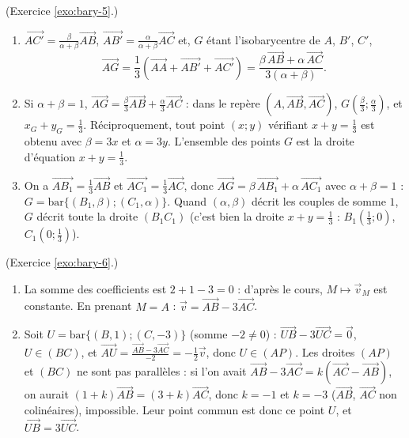\begin{corrige}
\begin{sol}
\end{sol}
%
\begin{sol} (Exercice \ref{exo:bary-5}.)
\begin{enumerate}
\item $\overrightarrow{AC'} = \frac{\beta}{\alpha+\beta}\overrightarrow{AB}$, $\overrightarrow{AB'} = \frac{\alpha}{\alpha+\beta}\overrightarrow{AC}$ et, $G$ \'etant l'isobarycentre de $A$, $B'$, $C'$,
      \[
      \overrightarrow{AG} = \frac{1}{3}\left(\overrightarrow{AA} + \overrightarrow{AB'} + \overrightarrow{AC'}\right) = \frac{\beta\,\overrightarrow{AB} + \alpha\,\overrightarrow{AC}}{3(\alpha+\beta)} .
      \]
\item Si $\alpha+\beta = 1$, $\overrightarrow{AG} = \frac{\beta}{3}\overrightarrow{AB} + \frac{\alpha}{3}\overrightarrow{AC}$ : dans le rep\`ere $(A,\overrightarrow{AB},\overrightarrow{AC})$,
      $G\left(\frac{\beta}{3} ; \frac{\alpha}{3}\right)$, et $x_G + y_G = \frac{1}{3}$.
      R\'eciproquement, tout point $(x ; y)$ v\'erifiant $x + y = \frac{1}{3}$ est obtenu avec $\beta = 3x$ et $\alpha = 3y$.
      L'ensemble des points $G$ est la droite d'\'equation $x + y = \frac{1}{3}$.
\item On a $\overrightarrow{AB_1} = \frac{1}{3}\overrightarrow{AB}$ et $\overrightarrow{AC_1} = \frac{1}{3}\overrightarrow{AC}$, donc
      $\overrightarrow{AG} = \beta\,\overrightarrow{AB_1} + \alpha\,\overrightarrow{AC_1}$ avec $\alpha + \beta = 1$ :
      $G = \mathrm{bar}\{(B_1,\beta);(C_1,\alpha)\}$. Quand $(\alpha,\beta)$ d\'ecrit les couples de somme $1$, $G$ d\'ecrit toute la droite $(B_1C_1)$
      (c'est bien la droite $x + y = \frac{1}{3}$ : $B_1(\frac{1}{3};0)$, $C_1(0;\frac{1}{3})$).
\end{enumerate}
\end{sol}
%
\begin{sol} (Exercice \ref{exo:bary-6}.)
\begin{enumerate}
\item La somme des coefficients est $2 + 1 - 3 = 0$ : d'apr\`es le cours, $M\mapsto\vec{v}_M$ est constante. En prenant $M = A$ :
      $\vec{v} = \overrightarrow{AB} - 3\overrightarrow{AC}$.
\item Soit $U = \mathrm{bar}\{(B,1);(C,-3)\}$ (somme $-2\neq 0$) : $\overrightarrow{UB} - 3\overrightarrow{UC} = \vec{0}$, $U \in (BC)$, et
      $\overrightarrow{AU} = \frac{\overrightarrow{AB} - 3\overrightarrow{AC}}{-2} = -\frac{1}{2}\vec{v}$, donc $U \in (AP)$.
      Les droites $(AP)$ et $(BC)$ ne sont pas parall\`eles : si l'on avait $\overrightarrow{AB} - 3\overrightarrow{AC} = k(\overrightarrow{AC} - \overrightarrow{AB})$, on aurait
      $(1+k)\overrightarrow{AB} = (3+k)\overrightarrow{AC}$, donc $k = -1$ et $k = -3$ ($\overrightarrow{AB}$, $\overrightarrow{AC}$ non colin\'eaires), impossible.
      Leur point commun est donc ce point $U$, et $\overrightarrow{UB} = 3\overrightarrow{UC}$.


\end{enumerate}
\end{sol}
\end{corrige}
